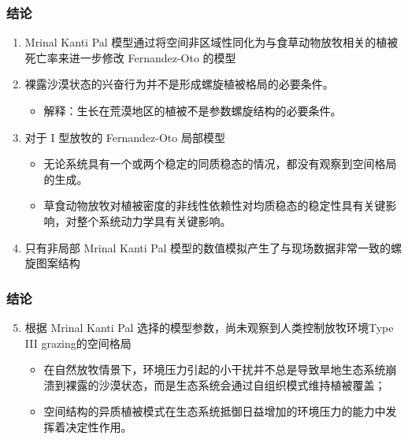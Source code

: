 \documentclass[aspectratio=169, 12pt, utf8, mathserif]{ctexbeamer} %
\begin{document}
\begin{frame}
	\frametitle{结论}
	\begin{enumerate}
		\item Mrinal Kanti Pal 模型通过将空间非区域性同化为与食草动物放牧相关的植被死亡率来进一步修改 Fernandez-Oto 的模型
		\item 裸露沙漠状态的兴奋行为并不是形成螺旋植被格局的必要条件。
		\begin{itemize}
			\item 解释：生长在荒漠地区的植被不是参数螺旋结构的必要条件。
		\end{itemize}
		\item 对于 I 型放牧的 Fernandez-Oto 局部模型
		\begin{itemize}
			\item 无论系统具有一个或两个稳定的同质稳态的情况，都没有观察到空间格局的生成。
			\item 草食动物放牧对植被密度的非线性依赖性对均质稳态的稳定性具有关键影响，对整个系统动力学具有关键影响。
		\end{itemize}
		\item 只有非局部 Mrinal Kanti Pal 模型的数值模拟产生了与现场数据非常一致的螺旋图案结构 \cite{[6]}
	\end{enumerate}
\end{frame}
\begin{frame}
	\frametitle{结论}
	\begin{enumerate}
		\setcounter{enumi}{4} %
		\item 根据 Mrinal Kanti Pal 选择的模型参数，尚未观察到人类控制放牧环境Type III grazing的空间格局
		\begin{itemize}
			\item 在自然放牧情景下，环境压力引起的小干扰并不总是导致旱地生态系统崩溃到裸露的沙漠状态，而是生态系统会通过自组织模式维持植被覆盖；
			\item 空间结构的异质植被模式在生态系统抵御日益增加的环境压力的能力中发挥着决定性作用。
		\end{itemize}
	\end{enumerate}
\end{frame}
\end{document}

